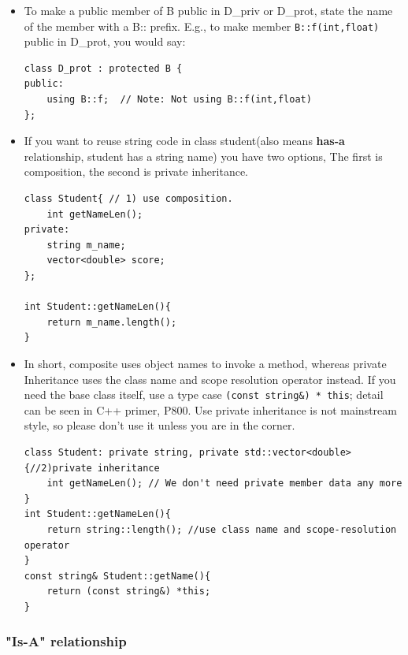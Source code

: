 \documentclass[a4paper,11pt,twoside]{book}
\begin{document}
\begin{itemize}
\begin{enumerate}
	\end{enumerate}

	\item To make a public member of B public in D\_priv or D\_prot, state the name of the member with a B:: prefix. E.g., to make member \texttt{B::f(int,float)} public in D\_prot, you would say:
\begin{lstlisting}[numbers=none]
class D_prot : protected B {
public:
	using B::f;  // Note: Not using B::f(int,float)
};
\end{lstlisting}

    \item If you want to reuse string code in class student(also means \textbf{has-a} relationship, student has a string name) you have two options, The first is composition,  the second is private inheritance.
\begin{lstlisting}[numbers=none]
class Student{ // 1) use composition.
	int getNameLen();
private:
	string m_name;
	vector<double> score;
};

int Student::getNameLen(){
	return m_name.length();
}
\end{lstlisting}

\item In short, composite uses object names to invoke a method, whereas private Inheritance uses the class name and scope resolution operator instead. If you need the base class itself, use a type case \texttt{(const string\&) * this}; detail can be seen in C++ primer, P800. Use private inheritance is not mainstream style, so please don't use it unless you are in the corner. 
\begin{lstlisting}[numbers=none]
class Student: private string, private std::vector<double>{//2)private inheritance
	int getNameLen(); // We don't need private member data any more
}
int Student::getNameLen(){
	return string::length(); //use class name and scope-resolution operator
}
const string& Student::getName(){
	return (const string&) *this;
}
\end{lstlisting}
\end{itemize}

\subsubsection{"Is-A" relationship}
\end{document}
